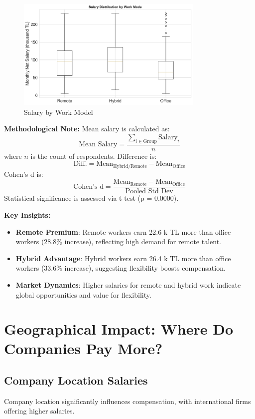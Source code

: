 \documentclass[12pt,a4paper]{article}
\begin{document}
\begin{figure}[H]
	\centering
	\includegraphics[width=0.8\textwidth]{figures/boxplot_work_mode.png}
	\caption{Salary by Work Model}
\end{figure}

\textbf{Methodological Note:}
Mean salary is calculated as:
\[
	\text{Mean Salary} = \frac{\sum_{i \in \text{Group}} \text{Salary}_i}{n}
\]
where \( n \) is the count of respondents. Difference is:
\[
	\text{Diff.} = \text{Mean}_{\text{Hybrid/Remote}} - \text{Mean}_{\text{Office}}
\]
Cohen's d is:
\[
	\text{Cohen's d} = \frac{\text{Mean}_{\text{Remote}} - \text{Mean}_{\text{Office}}}{\text{Pooled Std Dev}}
\]
Statistical significance is assessed via t-test (p = 0.0000).

\textbf{Key Insights:}
\begin{itemize}
	\item \textbf{Remote Premium}: Remote workers earn 22.6 k TL more than office workers (28.8\% increase), reflecting high demand for remote talent.
	\item \textbf{Hybrid Advantage}: Hybrid workers earn 26.4 k TL more than office workers (33.6\% increase), suggesting flexibility boosts compensation.
	\item \textbf{Market Dynamics}: Higher salaries for remote and hybrid work indicate global opportunities and value for flexibility.
\end{itemize}

\section{Geographical Impact: Where Do Companies Pay More?}

\subsection{Company Location Salaries}
Company location significantly influences compensation, with international firms offering higher salaries.
\end{document}
